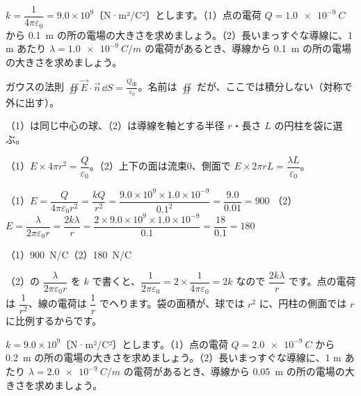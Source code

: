 \begin{reidai}
$k=\dfrac{1}{4\pi\varepsilon_0}=9.0\times10^9$〔N·m²/C²〕とします。（1）点の電荷 $Q=\qty{1.0e-9}{C}$ から \qty{0.1}{m} の所の電場の大きさを求めましょう。（2）長いまっすぐな導線に、1 m あたり $\lambda=\qty{1.0e-9}{C/m}$ の電荷があるとき、導線から \qty{0.1}{m} の所の電場の大きさを求めましょう。\par
\kangaekata {}\par
{}\enspace ガウスの法則 $\oiint\vec E\cdot\vec n\,\dd S=\frac{Q_{\text{中}}}{\varepsilon_0}$。名前は $\oiint$ だが、ここでは積分しない（対称で外に出す）。\par
{}\enspace（1）は同じ中心の球、（2）は導線を軸とする半径 $r$・長さ $L$ の円柱を袋に選ぶ。\par
{}\enspace（1）$E\times4\pi r^2=\dfrac{Q}{\varepsilon_0}$。（2）上下の面は流束0、側面で $E\times2\pi rL=\dfrac{\lambda L}{\varepsilon_0}$。\par
\shiki（1）$E=\dfrac{Q}{4\pi\varepsilon_0r^2}=\dfrac{kQ}{r^2}=\dfrac{9.0\times10^9\times1.0\times10^{-9}}{0.1^2}=\dfrac{9.0}{0.01}=900$\kviiilq
（2）$E=\dfrac{\lambda}{2\pi\varepsilon_0r}=\dfrac{2k\lambda}{r}=\dfrac{2\times9.0\times10^9\times1.0\times10^{-9}}{0.1}=\dfrac{18}{0.1}=180$\par
\kotae（1）\nobreak \qty{900}{N/C}\quad（2）\nobreak \qty{180}{N/C}
\end{reidai}
\noindent（2）の $\dfrac{\lambda}{2\pi\varepsilon_0r}$ を $k$ で書くと、$\dfrac{1}{2\pi\varepsilon_0}=2\times\dfrac{1}{4\pi\varepsilon_0}=2k$ なので $\dfrac{2k\lambda}{r}$ です。点の電荷は $\dfrac{1}{r^2}$、線の電荷は $\dfrac{1}{r}$ でへります。袋の面積が、球では $r^2$ に、円柱の側面では $r$ に比例するからです。

\begin{jibun}
$k=9.0\times10^9$〔N·m²/C²〕とします。（1）点の電荷 $Q=\qty{2.0e-9}{C}$ から \qty{0.2}{m} の所の電場の大きさを求めましょう。（2）長いまっすぐな導線に、1 m あたり $\lambda=\qty{2.0e-9}{C/m}$ の電荷があるとき、導線から \qty{0.05}{m} の所の電場の大きさを求めましょう。
\end{jibun}

